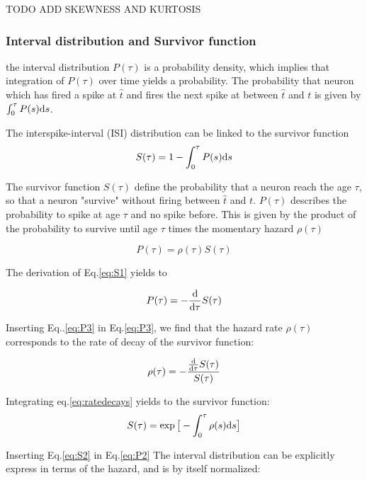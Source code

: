 \documentclass[a4paper,11pt,twoside]{article}
\def \dd  {{\rm d}}
\numberwithin{equation}{section}
\begin{document}
TODO ADD SKEWNESS AND KURTOSIS 

\subsubsection{Interval distribution and Survivor function}
the interval distribution $P(\tau)$ is a probability density, which implies that integration of $P(\tau)$ over time yields a probability. The probability that neuron which has fired a spike at $\hat{t}$ and fires the next spike at between $\hat{t}$ and $t$ is given by $\int_0^\tau P(s) \dd s$.

The interspike-interval (ISI) distribution can be linked to the survivor function
\begin{equation}
\label{eq:S1}
S(\tau)=1-\int_0^\tau P(s) \dd s
\end{equation}


The survivor function $S(\tau)$ define the probability that a neuron reach the age $\tau$, so that a neuron "survive" without firing between $\hat{t}$ and $t$. $P(\tau)$ describes the probability to spike at age $\tau$ and no spike before. This is given by the product of the probability to survive until age $\tau$ times the momentary hazard $\rho(\tau)$

\begin{equation}
\label{eq:P2}
P(\tau)=\rho(\tau)S(\tau)
\end{equation}

The derivation of Eq.\eqref{eq:S1} yields to 

\begin{equation}
\label{eq:P3}
P(\tau)=-\frac{\dd}{\dd \tau}S(\tau)
\end{equation}


Inserting Eq..\eqref{eq:P3} in Eq.\eqref{eq:P3}, we find that the hazard rate $\rho(\tau)$ corresponds to the rate of decay of the survivor function:

\begin{equation}
\label{eq:ratedecays}
\rho(\tau)=-\frac{\frac{\dd}{\dd \tau}S(\tau)}{S(\tau)}
\end{equation}

Integrating eq.\ref{eq:ratedecays} yields to the survivor function:
\begin{equation}
\label{eq:S2}
S(\tau)=\exp\big[-\int_0^\tau\rho(s)\dd s\big]
\end{equation}

 Inserting Eq.\eqref{eq:S2} in Eq.\eqref{eq:P2} The interval distribution can be explicitly express in terms of the hazard, and is by itself normalized:
\end{document}
